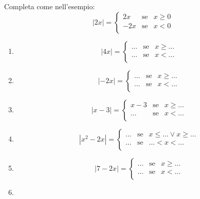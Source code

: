 Completa come nell'esempio:
$$
|2x|=
        \left\lbrace 
        \begin{array}{lcl}
        2x & \text{se}& x\geq 0\\
        -2x & \text{se}& x< 0\\
        \end{array}
        \right.
$$

\begin{enumerate}
        \item 
        $$
        |4x|=
        \left\lbrace 
        \begin{array}{lcl}
        \dots & \text{se}& x\geq\dots\\
        \dots & \text{se}& x<\dots\\
        \end{array}
        \right.
        $$
        \item 
        $$
        |-2x|=
        \left\lbrace 
        \begin{array}{lcl}
        \dots & \text{se}& x\geq\dots\\
        \dots & \text{se}& x<\dots\\
        \end{array}
        \right.
        $$
        \item 
        $$
        |x-3|=
        \left\lbrace 
        \begin{array}{lcl}
        x-3 & \text{se}& x\geq\dots\\
        \dots & \text{se}& x<\dots\\
        \end{array}
        \right.
        $$
        \item 
        $$
        |x^2-2x|=
        \left\lbrace 
        \begin{array}{lcl}
        \dots & \text{se}& x\leq\dots \vee x\geq\dots\\
        \dots & \text{se}& \dots <x<\dots\\
        \end{array}
        \right.
        $$
        \item 
        $$
        |7-2x|=
        \left\lbrace 
        \begin{array}{lcl}
        \dots & \text{se}& x\geq\dots\\
        \dots & \text{se}& x<\dots\\
        \end{array}
        \right.
        $$
        \item 
        $$
$$
\end{enumerate}
